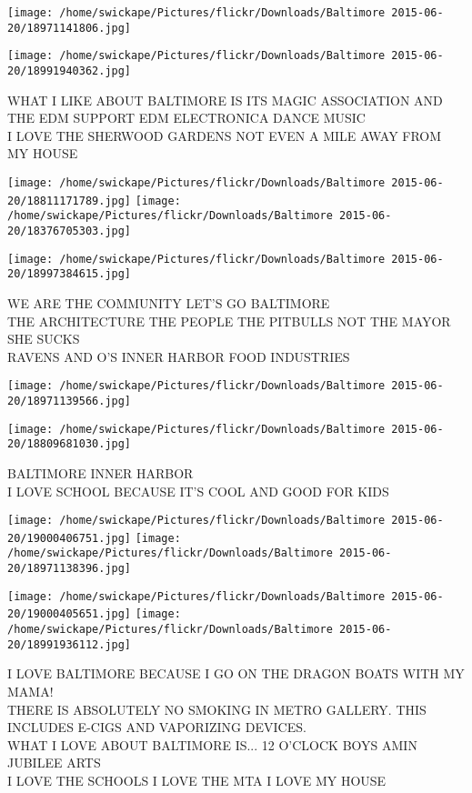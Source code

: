 \documentclass[10pt,letterpaper]{article}
\begin{document}
\texttt{[image: /home/swickape/Pictures/flickr/Downloads/Baltimore 2015-06-20/18971141806.jpg]}

\vspace{0.25in}
\texttt{[image: /home/swickape/Pictures/flickr/Downloads/Baltimore 2015-06-20/18991940362.jpg]}

WHAT I LIKE ABOUT BALTIMORE IS ITS MAGIC ASSOCIATION AND THE EDM SUPPORT EDM ELECTRONICA DANCE MUSIC\\
I LOVE THE SHERWOOD GARDENS NOT EVEN A MILE AWAY FROM MY HOUSE
\pagebreak

\texttt{[image: /home/swickape/Pictures/flickr/Downloads/Baltimore 2015-06-20/18811171789.jpg]}
\texttt{[image: /home/swickape/Pictures/flickr/Downloads/Baltimore 2015-06-20/18376705303.jpg]}

\texttt{[image: /home/swickape/Pictures/flickr/Downloads/Baltimore 2015-06-20/18997384615.jpg]}

WE ARE THE COMMUNITY LET'S GO BALTIMORE\\
THE ARCHITECTURE THE PEOPLE THE PITBULLS NOT THE MAYOR SHE SUCKS\\
RAVENS AND O'S INNER HARBOR FOOD INDUSTRIES
\pagebreak

\texttt{[image: /home/swickape/Pictures/flickr/Downloads/Baltimore 2015-06-20/18971139566.jpg]}

\vspace{0.25in}
\texttt{[image: /home/swickape/Pictures/flickr/Downloads/Baltimore 2015-06-20/18809681030.jpg]}

BALTIMORE INNER HARBOR\\
I LOVE SCHOOL BECAUSE IT'S COOL AND GOOD FOR KIDS
\pagebreak

\texttt{[image: /home/swickape/Pictures/flickr/Downloads/Baltimore 2015-06-20/19000406751.jpg]}
\texttt{[image: /home/swickape/Pictures/flickr/Downloads/Baltimore 2015-06-20/18971138396.jpg]}

\texttt{[image: /home/swickape/Pictures/flickr/Downloads/Baltimore 2015-06-20/19000405651.jpg]}
\texttt{[image: /home/swickape/Pictures/flickr/Downloads/Baltimore 2015-06-20/18991936112.jpg]}

I LOVE BALTIMORE BECAUSE I GO ON THE DRAGON BOATS WITH MY MAMA!\\
THERE IS ABSOLUTELY NO SMOKING IN METRO GALLERY.  THIS INCLUDES E{-}CIGS AND VAPORIZING DEVICES.\\
WHAT I LOVE ABOUT BALTIMORE IS... 12 O'CLOCK BOYS AMIN JUBILEE ARTS\\
I LOVE THE SCHOOLS I LOVE THE MTA I LOVE MY HOUSE
\pagebreak
\end{document}
